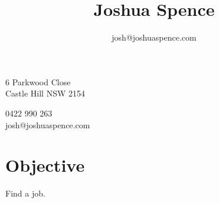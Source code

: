 \documentclass[10pt]{article}
\title{\bfseries\Huge Joshua Spence}
\author{josh@joshuaspence.com}
\date{}
\begin{document}
\maketitle
\vspace{1em}
\begin{minipage}[ht]{0.48\textwidth}
6 Parkwood Close \\
Castle Hill NSW 2154
\end{minipage}
\begin{minipage}[ht]{0.48\textwidth}
0422 990 263\\
josh@joshuaspence.com
\end{minipage}
\vspace{20pt}

\section*{Objective}
Find a job.

\end{document}
